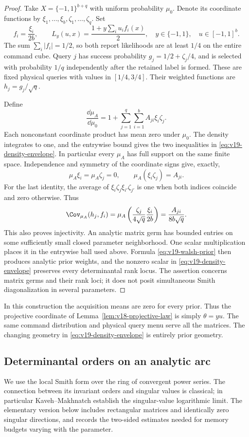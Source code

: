 \documentclass[11pt]{amsart}
\theoremstyle{definition}\newtheorem{definition}[theorem]{Definition}
\theoremstyle{remark}\newtheorem{remark}[theorem]{Remark}
\begin{document}
\begin{proof}
Take $X=\{-1,1\}^{b+q}$ with uniform probability $\mu_0$. Denote
its coordinate functions by $\xi_1,\ldots,\xi_b,\zeta_1,\ldots,\zeta_q$.
Set
\[
 f_i=\frac{\xi_i}{2b},\qquad
 L_y(u,x)=\frac{1+y\sum_i u_i f_i(x)}2,
 \quad y\in\{-1,1\},\quad u\in[-1,1]^b.
\]
The sum $\sum_i|f_i|=1/2$, so both report likelihoods are at least
$1/4$ on the entire command cube. Query $j$ has success probability
$g_j=1/2+\zeta_j/4$, and is selected with probability $1/q$
independently after the retained label is formed. These are fixed
physical queries with values in $[1/4,3/4]$. Their weighted functions
are $h_j=g_j/\sqrt q$.

Define
\begin{equation}\label{eq:v19-walsh-prior}
 \frac{\dd\mu_A}{\dd\mu_0}
       =1+\sum_{j=1}^q\sum_{i=1}^b A_{ji}\xi_i\zeta_j.
\end{equation}
Each nonconstant coordinate product has mean zero under $\mu_0$.
The density integrates to one, and the entrywise bound gives the two
inequalities in \eqref{eq:v19-density-envelope}. In particular every
$\mu_A$ has full support on the same finite space. Independence and
symmetry of the coordinate signs give, exactly,
\[
 \mu_A\xi_i=\mu_A\zeta_j=0,\qquad
 \mu_A(\xi_i\zeta_j)=A_{ji}.
\]
For the last identity, the average of
$\xi_i\zeta_j\xi_{i'}\zeta_{j'}$ is one when both indices coincide
and zero otherwise. Thus
\[
 \Cov_{\mu_A}(h_j,f_i)
   =\mu_A\left(\frac{\zeta_j}{4\sqrt q}
                       \frac{\xi_i}{2b}\right)
   =\frac{A_{ji}}{8b\sqrt q}.
\]
This also proves injectivity. An analytic matrix germ has bounded
entries on some sufficiently small closed parameter neighborhood.
One scalar multiplication places it in the entrywise ball used above.
Formula \eqref{eq:v19-walsh-prior} then produces analytic prior
weights, and the nonzero scalar in \eqref{eq:v19-density-envelope}
preserves every determinantal rank locus. The assertion concerns
matrix germs and their rank loci; it does not posit simultaneous
Smith diagonalization in several parameters.
\end{proof}

In this construction the acquisition means are zero for every prior.
Thus the projective coordinate of Lemma~\ref{lem:v18-projective-law}
is simply $\theta=yu$. The same command distribution and physical
query menu serve all the matrices. The changing geometry in
\eqref{eq:v19-density-envelope} is entirely prior geometry.

\subsection{Determinantal orders on an analytic arc}
We use the local Smith form over the ring of convergent power series.
The connection between its invariant orders and singular values is
classical; in particular Kaveh--Makhnatch
\cite[Theorem 1.1 and Section 6]{KavehMakhnatch} establish the
singular-value logarithmic limit. The elementary version below includes
rectangular matrices and identically zero singular directions, and
records the two-sided estimates needed for memory budgets varying
with the parameter.
\end{document}
